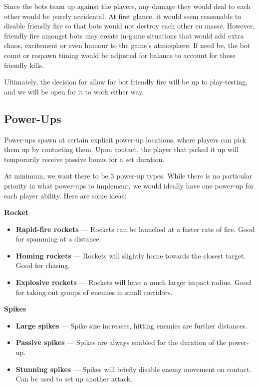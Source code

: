 \documentclass{article}
\theoremstyle{definition}
\begin{document}
Since the bots team up against the players, any damage they would deal to each
other would be purely accidental. At first glance, it would seem reasonable to
disable friendly fire so that bots would not destroy each other en masse.
However, friendly fire amongst bots may create in-game situations that would
add extra chaos, excitement or even humour to the game's atmosphere. If need
be, the bot count or respawn timing would be adjusted for balance to account
for these friendly kills.

Ultimately, the decision for allow for bot friendly fire will be up to
play-testing, and we will be open for it to work either way.

\subsection{Power-Ups}

Power-ups spawn at certain explicit power-up locations, where players can pick
them up by contacting them. Upon contact, the player that picked it up will
temporarily receive passive bonus for a set duration.

At minimum, we want there to be 3 power-up types. While there is no particular
priority in what power-ups to implement, we would ideally have one power-up for
each player ability. Here are some ideas:

\textbf{Rocket}
\begin{itemize}
  \item \textbf{Rapid-fire rockets} --- Rockets can be launched at a faster rate of
    fire. Good for spamming at a distance.
  \item \textbf{Homing rockets} --- Rockets will slightly home towards the
    closest target. Good for chasing.
  \item \textbf{Explosive rockets} --- Rockets will have a much larger impact
    radius. Good for taking out groups of enemies in small corridors.
\end{itemize}

\textbf{Spikes}
\begin{itemize}
  \item \textbf{Large spikes} --- Spike size increases, hitting enemies are
    further distances.
  \item \textbf{Passive spikes} --- Spikes are always enabled for the duration
    of the power-up.
  \item \textbf{Stunning spikes} --- Spikes will briefly disable enemy movement
    on contact. Can be used to set up another attack.
\end{itemize}
\end{document}
